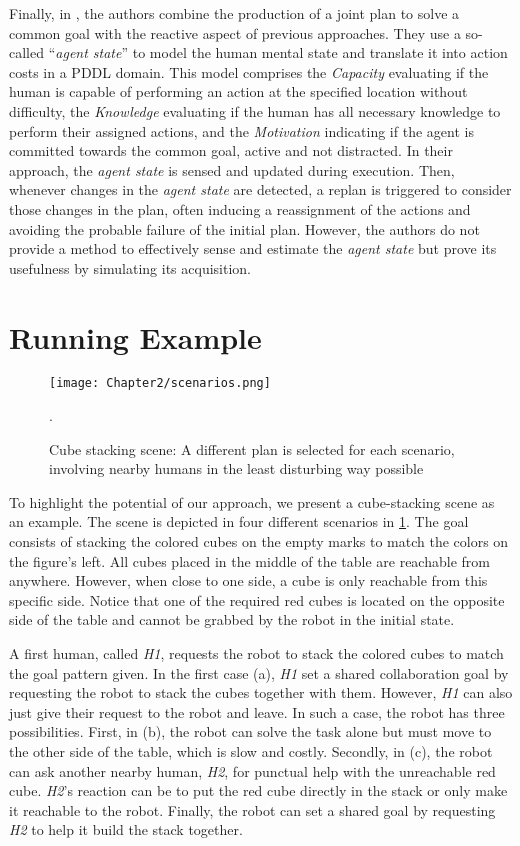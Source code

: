 Finally, in \cite{izquierdo_badiola_improved_2022}, the authors combine the production of a joint plan to solve a common goal with the reactive aspect of previous approaches. 
They use a so-called ``\textit{agent state}'' to model the human mental state and translate it into action costs in a PDDL domain. This model comprises the \textit{Capacity} evaluating if the human is capable of performing an action at the specified location without difficulty, the \textit{Knowledge} evaluating if the human has all necessary knowledge to perform their assigned actions, and the \textit{Motivation} indicating if the agent is committed towards the common goal, active and not distracted. 
In their approach, the \textit{agent state} is sensed and updated during execution. Then, whenever changes in the \textit{agent state} are detected, a replan is triggered to consider those changes in the plan, often inducing a reassignment of the actions and avoiding the probable failure of the initial plan. However, the authors do not provide a method to effectively sense and estimate the \textit{agent state} but prove its usefulness by simulating its acquisition.


\section{Running Example}

\begin{figure}
    \centering
    \texttt{[image: Chapter2/scenarios.png]}
    \caption{Cube stacking scene: A different plan is selected for each scenario, involving nearby humans in the least disturbing way possible}.
    \label{fig:scenarios}
\end{figure}

To highlight the potential of our approach, we present a cube-stacking scene as an example. The scene is depicted in four different scenarios in \ref{fig:scenarios}. The goal consists of stacking the colored cubes on the empty marks to match the colors on the figure's left. All cubes placed in the middle of the table are reachable from anywhere. However, when close to one side, a cube is only reachable from this specific side. Notice that one of the required red cubes is located on the opposite side of the table and cannot be grabbed by the robot in the initial state.

A first human, called \textit{H1}, requests the robot to stack the colored cubes to match the goal pattern given. In the first case (a), \textit{H1} set a shared collaboration goal by requesting the robot to stack the cubes together with them. However, \textit{H1} can also just give their request to the robot and leave. In such a case, the robot has three possibilities. First, in (b), the robot can solve the task alone but must move to the other side of the table, which is slow and costly. Secondly, in (c), the robot can ask another nearby human, \textit{H2}, for punctual help with the unreachable red cube. \textit{H2}'s reaction can be to put the red cube directly in the stack or only make it reachable to the robot. Finally, the robot can set a shared goal by requesting \textit{H2} to help it build the stack together. 

